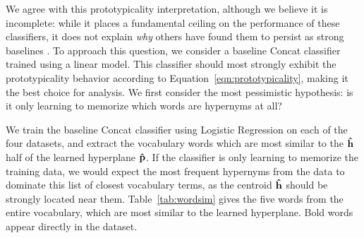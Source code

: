 We agree with this prototypicality interpretation, although we believe it is incomplete:
while it places a fundamental ceiling on the performance of these classifiers, it
does not explain {\em why} others have found them to persist as strong
baselines
\cite{weeds:2014:coling,roller:2014:coling,kruszewski:2015:tacl,vylomova:2016:acl}.
To approach this question, we consider a baseline Concat classifier trained
using a linear model. This classifier should most strongly exhibit the prototypicality
behavior according to Equation~\ref{eqn:prototypicality}, making it the best
choice for analysis. We first consider the most pessimistic hypothesis: is it
only learning to memorize which words are hypernyms at all?

We train the baseline Concat classifier using Logistic Regression on each of
the four datasets, and extract the vocabulary words which are most similar to
the ${\mathbf{\hat h}}$ half of the learned hyperplane ${\mathbf{\hat p}}$. If the classifier is only
learning to memorize the training data, we would expect the most frequent
hypernyms from the data to dominate this list of closest vocabulary terms, as
the centroid ${\mathbf{\hat h}}$ should be strongly located near them.
Table~\ref{tab:wordsim} gives the five words from the entire vocabulary, which
are most similar to the learned hyperplane. Bold words appear directly in
the dataset.

